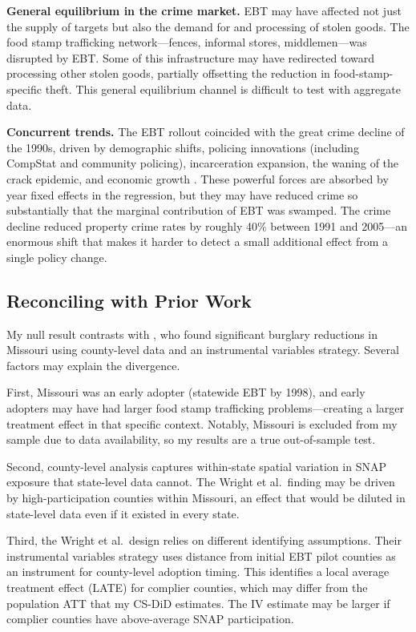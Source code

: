 \documentclass[12pt]{article}
\begin{document}
\textbf{General equilibrium in the crime market.} EBT may have affected not just the supply of targets but also the demand for and processing of stolen goods. The food stamp trafficking network---fences, informal stores, middlemen---was disrupted by EBT. Some of this infrastructure may have redirected toward processing other stolen goods, partially offsetting the reduction in food-stamp-specific theft. This general equilibrium channel is difficult to test with aggregate data.

\textbf{Concurrent trends.} The EBT rollout coincided with the great crime decline of the 1990s, driven by demographic shifts, policing innovations (including CompStat and community policing), incarceration expansion, the waning of the crack epidemic, and economic growth \citep{levitt2004understanding, zimring2008great}. These powerful forces are absorbed by year fixed effects in the regression, but they may have reduced crime so substantially that the marginal contribution of EBT was swamped. The crime decline reduced property crime rates by roughly 40\% between 1991 and 2005---an enormous shift that makes it harder to detect a small additional effect from a single policy change.

\subsection{Reconciling with Prior Work}

My null result contrasts with \citet{wright2017less}, who found significant burglary reductions in Missouri using county-level data and an instrumental variables strategy. Several factors may explain the divergence.

First, Missouri was an early adopter (statewide EBT by 1998), and early adopters may have had larger food stamp trafficking problems---creating a larger treatment effect in that specific context. Notably, Missouri is excluded from my sample due to data availability, so my results are a true out-of-sample test.

Second, county-level analysis captures within-state spatial variation in SNAP exposure that state-level data cannot. The Wright et al.\ finding may be driven by high-participation counties within Missouri, an effect that would be diluted in state-level data even if it existed in every state.

Third, the Wright et al.\ design relies on different identifying assumptions. Their instrumental variables strategy uses distance from initial EBT pilot counties as an instrument for county-level adoption timing. This identifies a local average treatment effect (LATE) for complier counties, which may differ from the population ATT that my CS-DiD estimates. The IV estimate may be larger if complier counties have above-average SNAP participation.
\end{document}
